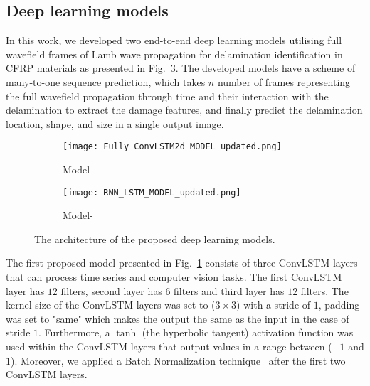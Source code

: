\subsection{Deep learning models}
\label{proposed_approach}
In this work, we developed two end-to-end deep learning models utilising full wavefield frames of Lamb wave propagation for delamination identification in CFRP materials as presented in Fig.~\ref{fig:proposed_models}.
The developed models have a scheme of many-to-one sequence prediction, which takes \(n\) number of frames representing the full wavefield propagation through time and their interaction with the delamination to extract the damage features, and finally predict the delamination location, shape, and size in a single output image.
\begin{figure} [!h]
	\centering
	\begin{subfigure}[b]{0.49\textwidth}
		\centering
		\texttt{[image: Fully\_ConvLSTM2d\_MODEL\_updated.png]}
		\caption{Model-} %
		\label{fig:convlstm_model}
	\end{subfigure}
	\hfill
	\begin{subfigure}[b]{0.49\textwidth}
		\centering
		\texttt{[image: RNN\_LSTM\_MODEL\_updated.png]}
		\caption{Model-} %
		\label{fig:AE_convlstm}
	\end{subfigure}
	\caption{The architecture of the proposed deep learning models.}
	\label{fig:proposed_models}
\end{figure} 

The first proposed model presented in Fig.~\ref{fig:convlstm_model} 
consists of three ConvLSTM layers that can process time series and computer vision tasks.
The first ConvLSTM layer has \(12\) filters, second layer has \(6\) filters and third layer has \(12\) filters.
The kernel size of the ConvLSTM layers was set to (\(3\times3\)) with a stride of \(1\), padding was set to "same" which makes the output the same as the input in the case of stride \(1\).
Furthermore, a \(\tanh\) (the hyperbolic tangent) activation function was used within the ConvLSTM layers that output values in a range between (\(-1\) and \(1\)).
Moreover, we applied a Batch Normalization technique~\cite{Santurkar2018} after the first two ConvLSTM layers.  

